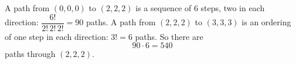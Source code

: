 A path from $(0,0,0)$ to $(2,2,2)$ is a sequence of $6$ steps, two in each direction: $\dfrac{6!}{2!\,2!\,2!}=90$ paths. A path from $(2,2,2)$ to $(3,3,3)$ is an ordering of one step in each direction: $3!=6$ paths. So there are
\[90\cdot6=\boxed{540}\]
paths through $(2,2,2)$.
